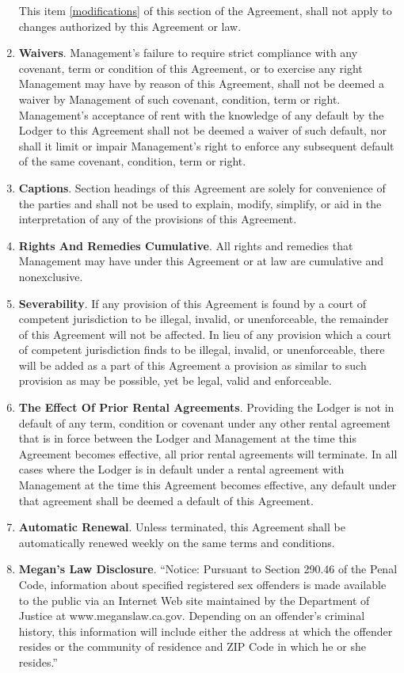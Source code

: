 \documentclass[12pt,letterpaper]{article}
\newcommand{\lodger}{Lodger}
\newcommand{\management}{Management}
\begin{document}
\begin{enumerate}
		This item \ref{modifications} of this section of the Agreement, shall not apply to changes authorized by this Agreement or law.
	\item \textbf{Waivers}. 
		\management{}'s failure to require strict compliance with any covenant, term or condition of this Agreement, or to exercise any right \management{} may have by reason of this Agreement, shall not be deemed a waiver by \management{} of such covenant, condition, term or right. \management{}'s acceptance of rent with the knowledge of any default by the \lodger{} to this Agreement shall not be deemed a waiver of such default, nor shall it limit or impair \management{}'s right to enforce any subsequent default of the same covenant, condition, term or right. 
	\item \textbf{Captions}. 
		Section headings of this Agreement are solely for convenience of the parties and shall not be used to explain, modify, simplify, or aid in the interpretation of any of the provisions of this Agreement. 
	\item \textbf{Rights And Remedies Cumulative}. 
		All rights and remedies that \management{} may have under this Agreement or at law are cumulative and nonexclusive. 
	\item \textbf{Severability}. 
		If any provision of this Agreement is found by a court of competent jurisdiction to be illegal, invalid, or unenforceable, the remainder of this Agreement will not be affected. In lieu of any provision which a court of competent jurisdiction finds to be illegal, invalid, or unenforceable, there will be added as a part of this Agreement a provision as similar to such provision as may be possible, yet be legal, valid and enforceable. 
	\item \textbf{The Effect Of Prior Rental Agreements}. 
		Providing the \lodger{} is not in default of any term, condition or covenant under any other rental agreement that is in force between the \lodger{} and \management{} at the time this Agreement becomes effective, all prior rental agreements will terminate. In all cases where the \lodger{} is in default under a rental agreement with \management{} at the time this Agreement becomes effective, any default under that agreement shall be deemed a default of this Agreement. 
	\item \textbf{Automatic Renewal}.
		Unless terminated, this Agreement shall be automatically renewed weekly on the same terms and conditions. 
	\item \textbf{Megan's Law Disclosure}.
		``Notice: Pursuant to Section 290.46 of the Penal Code, information about specified registered sex offenders is made available to the public via an Internet Web site maintained by the Department of Justice at www.meganslaw.ca.gov. Depending on an offender's criminal history, this information will include either the address at which the offender resides or the community of residence and ZIP Code in which he or she resides.''
\end{enumerate}
\end{document}
